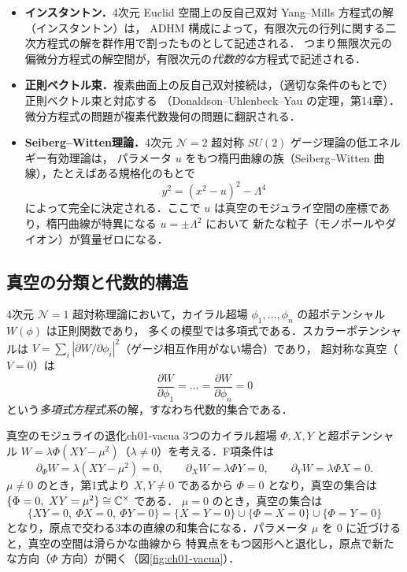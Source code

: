 \begin{itemize}
  \item \textbf{インスタントン．}4次元 Euclid 空間上の反自己双対 Yang--Mills 方程式の解（インスタントン）は，
        ADHM 構成によって，有限次元の行列に関する二次方程式の解を群作用で割ったものとして記述される．
        つまり無限次元の偏微分方程式の解空間が，有限次元の\emph{代数的な}方程式で記述される．
  \item \textbf{正則ベクトル束．}複素曲面上の反自己双対接続は，（適切な条件のもとで）正則ベクトル束と対応する
        （Donaldson--Uhlenbeck--Yau の定理，第14章）．微分方程式の問題が複素代数幾何の問題に翻訳される．
  \item \textbf{Seiberg--Witten理論．}4次元 $\mathcal N=2$ 超対称 $SU(2)$ ゲージ理論の低エネルギー有効理論は，
        パラメータ $u$ をもつ楕円曲線の族（Seiberg--Witten 曲線），たとえばある規格化のもとで
        \[
          y^2=(x^2-u)^2-\Lambda^4
        \]
        によって完全に決定される．ここで $u$ は真空のモジュライ空間の座標であり，楕円曲線が特異になる $u=\pm\Lambda^2$ において
        新たな粒子（モノポールやダイオン）が質量ゼロになる．
\end{itemize}

\subsection{真空の分類と代数的構造}

4次元 $\mathcal N=1$ 超対称理論において，カイラル超場 $\phi_1,\dots,\phi_n$ の超ポテンシャル $W(\phi)$ は正則関数であり，
多くの模型では多項式である．スカラーポテンシャルは $V=\sum_i|\partial W/\partial\phi_i|^2$（ゲージ相互作用がない場合）であり，
超対称な真空（$V=0$）は
\[
  \frac{\partial W}{\partial\phi_1}=\dots=\frac{\partial W}{\partial\phi_n}=0
\]
という\emph{多項式方程式系}の解，すなわち代数的集合である．

\begin{myex}{真空のモジュライの退化}{ch01-vacua}
3つのカイラル超場 $\Phi,X,Y$ と超ポテンシャル $W=\lambda\Phi(XY-\mu^2)$（$\lambda\ne0$）を考える．F項条件は
\[
  \partial_\Phi W=\lambda(XY-\mu^2)=0,\qquad \partial_XW=\lambda\Phi Y=0,\qquad \partial_YW=\lambda\Phi X=0.
\]
$\mu\ne0$ のとき，第1式より $X,Y\ne0$ であるから $\Phi=0$ となり，真空の集合は $\{\Phi=0,\ XY=\mu^2\}\cong\C^\times$ である．
$\mu=0$ のとき，真空の集合は
\[
  \{XY=0,\ \Phi X=0,\ \Phi Y=0\}=\{X=Y=0\}\cup\{\Phi=X=0\}\cup\{\Phi=Y=0\}
\]
となり，原点で交わる3本の直線の和集合になる．パラメータ $\mu$ を $0$ に近づけると，真空の空間は滑らかな曲線から
特異点をもつ図形へと退化し，原点で新たな方向（$\Phi$ 方向）が開く（図\ref{fig:ch01-vacua}）．
\end{myex}

